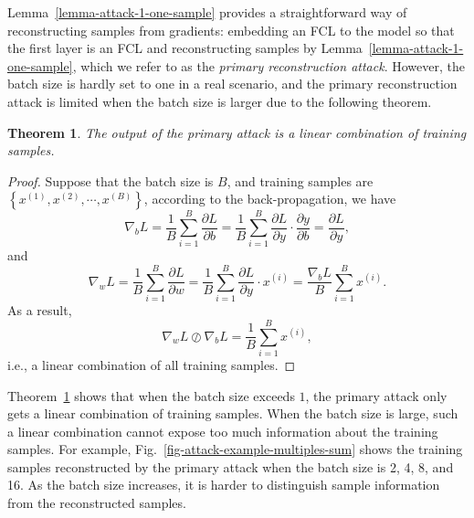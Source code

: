 \documentclass[lettersize,journal]{IEEEtran}
\newtheorem{theorem}{Theorem}
\begin{document}
Lemma~\ref{lemma-attack-1-one-sample} provides a straightforward way of reconstructing samples from gradients: embedding an FCL to the model so that the first layer is an FCL and reconstructing samples by Lemma~\ref{lemma-attack-1-one-sample}, which we refer to as the \textit{primary reconstruction attack}. However, the batch size is hardly set to one in a real scenario, and the primary reconstruction attack is limited when the batch size is larger due to the following theorem.

\begin{theorem}
The output of the primary attack is a linear combination of training samples.
\label{theorem-attack-2-multiple-samples}
\end{theorem}

\begin{proof}
Suppose that the batch size is $B$, and training samples are $\left\{ x^{\left(1\right)}, x^{\left(2\right)}, \cdots, x^{\left(B\right)} \right\}$, according to the back-propagation, we have 
\begin{equation}
\nabla_{b} L = \frac{1}{B} \sum_{i=1}^{B} \frac{\partial L }{\partial b} = \frac{1}{B} \sum_{i=1}^{B} \frac{\partial L }{\partial y} \cdot \frac{\partial y}{\partial b} =  \frac{\partial L}{ \partial y},
\end{equation}
and
\begin{equation}
\nabla_{w} L = \frac{1}{B} \sum_{i=1}^{B} \frac{\partial L }{\partial w} = \frac{1}{B} \sum_{i=1}^{B} \frac{\partial L}{ \partial y} \cdot x^{\left( i \right)} = \frac{\nabla_{b} L}{B} \sum_{i=1}^{B} x^{\left( i \right)}.
\end{equation}
As a result,
\begin{equation}
\nabla_{w} L \oslash \nabla_{b} L =  \frac{1}{B} \sum_{i=1}^{B} x^{(i)},
\end{equation}
i.e., a linear combination of all training samples.
\end{proof}

Theorem~\ref{theorem-attack-2-multiple-samples} shows that when the batch size exceeds $1$, the primary attack only gets a linear combination of training samples. When the batch size is large, such a linear combination cannot expose too much information about the training samples. For example, Fig.~\ref{fig-attack-example-multiples-sum} shows the training samples reconstructed by the primary attack when the batch size is 2, 4, 8, and 16. As the batch size increases, it is harder to distinguish sample information from the reconstructed samples.
\end{document}
